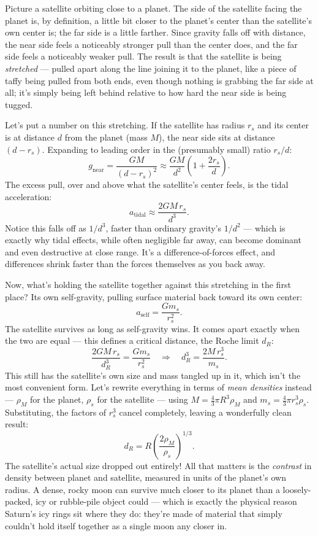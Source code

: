 \documentclass[11pt]{article}
\begin{document}
Picture a satellite orbiting close to a planet. The side of the satellite facing the planet is,
by definition, a little bit closer to the planet's center than the satellite's own center is; the
far side is a little farther. Since gravity falls off with distance, the near side feels a
noticeably stronger pull than the center does, and the far side feels a noticeably weaker pull.
The result is that the satellite is being \emph{stretched} --- pulled apart along the line joining
it to the planet, like a piece of taffy being pulled from both ends, even though nothing is
grabbing the far side at all; it's simply being left behind relative to how hard the near side is
being tugged.

Let's put a number on this stretching. If the satellite has radius $r_s$ and its center is at
distance $d$ from the planet (mass $M$), the near side sits at distance $(d-r_s)$. Expanding to
leading order in the (presumably small) ratio $r_s/d$:
\[
g_{\text{near}} = \frac{GM}{(d-r_s)^2} \approx \frac{GM}{d^2}\left(1+\frac{2r_s}{d}\right).
\]
The excess pull, over and above what the satellite's center feels, is the tidal acceleration:
\[
\boxed{a_{\text{tidal}} \approx \frac{2GM\,r_s}{d^3}.}
\]
Notice this falls off as $1/d^3$, faster than ordinary gravity's $1/d^2$ --- which is exactly why
tidal effects, while often negligible far away, can become dominant and even destructive at close
range. It's a difference-of-forces effect, and differences shrink faster than the forces
themselves as you back away.

Now, what's holding the satellite together against this stretching in the first place? Its own
self-gravity, pulling surface material back toward its own center:
\[
a_{\text{self}} = \frac{Gm_s}{r_s^2}.
\]
The satellite survives as long as self-gravity wins. It comes apart exactly when the two are equal
--- this defines a critical distance, the Roche limit $d_R$:
\[
\frac{2GM\,r_s}{d_R^3} = \frac{Gm_s}{r_s^2} \quad\Longrightarrow\quad d_R^3 = \frac{2M\,r_s^3}{m_s}.
\]
This still has the satellite's own size and mass tangled up in it, which isn't the most convenient
form. Let's rewrite everything in terms of \emph{mean densities} instead --- $\rho_M$ for the
planet, $\rho_s$ for the satellite --- using $M=\frac43\pi R^3\rho_M$ and $m_s=\frac43\pi
r_s^3\rho_s$. Substituting, the factors of $r_s^3$ cancel completely, leaving a wonderfully clean
result:
\[
\boxed{d_R = R\left(\frac{2\rho_M}{\rho_s}\right)^{1/3}.}
\]
The satellite's actual size dropped out entirely! All that matters is the \emph{contrast} in
density between planet and satellite, measured in units of the planet's own radius. A dense, rocky
moon can survive much closer to its planet than a loosely-packed, icy or rubble-pile object could
--- which is exactly the physical reason Saturn's icy rings sit where they do: they're made of
material that simply couldn't hold itself together as a single moon any closer in.
\end{document}
